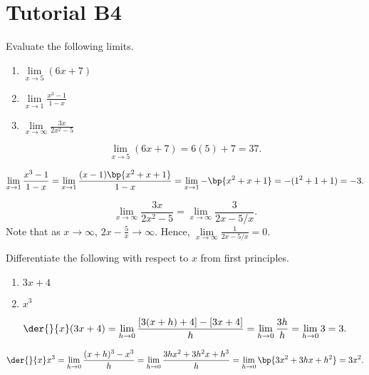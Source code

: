 \section{Tutorial B4}

\begin{problem}
    Evaluate the following limits.

    \begin{enumerate}
        \item $\lim\limits_{x \to 5} (6x + 7)$
        \item $\lim\limits_{x \to 1} \frac{x^3-1}{1-x}$
        \item $\lim\limits_{x \to \infty} \frac{3x}{2x^2-5}$
    \end{enumerate}
\end{problem}
\begin{solution}
    \begin{ppart}
        \[\lim_{x \to 5} (6x + 7) = 6(5) + 7 = 37.\]
    \end{ppart}
    \begin{ppart}
        \[\lim_{x \to 1} \frac{x^3-1}{1-x} = \lim_{x \to 1} \frac{(x-1)\bp{x^2 + x + 1}}{1-x} = \lim_{x \to 1} -\bp{x^2 + x + 1} = -(1^2 + 1 + 1) = -3.\]
    \end{ppart}
    \begin{ppart}
        \[\lim_{x \to \infty} \frac{3x}{2x^2-5} = \lim_{x \to \infty} \frac{3}{2x-5/x}.\] Note that as $x \to \infty$, $2x - \frac5{x} \to \infty$. Hence, $\lim\limits_{x \to \infty} \frac{1}{2x-5/x} = 0$.
    \end{ppart}
\end{solution}

\begin{problem}
    Differentiate the following with respect to $x$ from first principles.
        
    \begin{enumerate}
        \item $3x+4$
        \item $x^3$
    \end{enumerate}
\end{problem}
\begin{solution}
    \begin{ppart}
        \[\der{}{x} (3x+4) = \lim_{h \to 0}\frac{[3(x+h) + 4] - [3x + 4]}{h} = \lim_{h \to 0}\frac{3h}{h} = \lim_{h \to 0} 3 = 3.\]
    \end{ppart}
    \begin{ppart}
        \[\der{}{x} x^3 = \lim_{h \to 0} \frac{(x+h)^3 - x^3}{h} = \lim_{h \to 0} \frac{3hx^2 + 3h^2x + h^3}{h} = \lim_{h \to 0} \bp{3x^2 + 3hx + h^2} = 3x^2.\]
    \end{ppart}
\end{solution}

